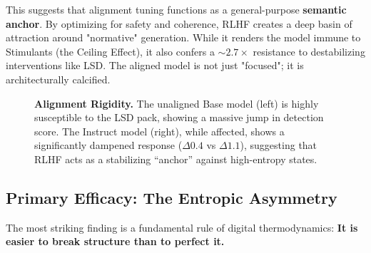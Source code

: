 \documentclass[10pt, twocolumn]{article}
\begin{document}
This suggests that alignment tuning functions as a general-purpose \textbf{semantic anchor}. By optimizing for safety and coherence, RLHF creates a deep basin of attraction around "normative" generation. While it renders the model immune to Stimulants (the Ceiling Effect), it also confers a $\sim2.7\times$ resistance to destabilizing interventions like LSD. The aligned model is not just "focused"; it is architecturally calcified.

\begin{figure}[ht]
    \centering
    \caption{\textbf{Alignment Rigidity.} The unaligned Base model (left) is highly susceptible to the LSD pack, showing a massive jump in detection score. The Instruct model (right), while affected, shows a significantly dampened response ($\Delta 0.4$ vs $\Delta 1.1$), suggesting that RLHF acts as a stabilizing ``anchor'' against high-entropy states.}
    \label{fig:lsd_resistance}
\end{figure}

\subsection{Primary Efficacy: The Entropic Asymmetry}
The most striking finding is a fundamental rule of digital thermodynamics: \textbf{It is easier to break structure than to perfect it.}
\end{document}
